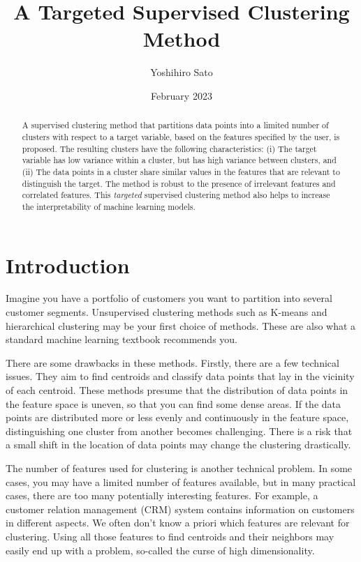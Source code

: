 \documentclass{article}
\title{A Targeted Supervised Clustering Method} %
\author{Yoshihiro Sato}
\date{February 2023}
\begin{document}
\begin{abstract}
A supervised clustering method that partitions data points into a limited number of clusters with respect to a target variable, based on the features specified by the user, is proposed.
The resulting clusters have the following characteristics: 
(i) The target variable has low variance within a cluster, but has high variance between clusters, and (ii) The data points in a cluster share similar values in the features that are relevant to distinguish the target. 
The method is robust to %
the presence of irrelevant features and correlated features. 
This {\em targeted}  supervised clustering method also helps to increase the interpretability of machine learning models.
\end{abstract}

\maketitle

\section{Introduction}

Imagine you have a portfolio of customers you want to partition into several customer segments. Unsupervised clustering methods such as K-means and hierarchical clustering may be your first choice of methods. These are also what a standard machine learning textbook recommends you. 

There are some drawbacks in these methods. Firstly, there are a few technical issues. They aim to find centroids and classify data points that lay in the vicinity of each centroid. These methods presume that the distribution of data points in the feature space is uneven, so that you can find some dense areas. If the data points are distributed more or less evenly and continuously in the feature space, distinguishing one cluster from another becomes challenging. There is a risk that a small shift in the location of data points may change the clustering drastically.

The number of features used for clustering is another technical problem. In some cases, you may have a limited number of features available, but in many practical cases, there are too many potentially interesting features. For example, a customer relation management (CRM) system contains information on customers in different aspects. We often don’t know a priori which features are relevant for clustering. Using all those features to find centroids and their neighbors may easily end up with a problem, so-called the curse of high dimensionality. 
\end{document}
